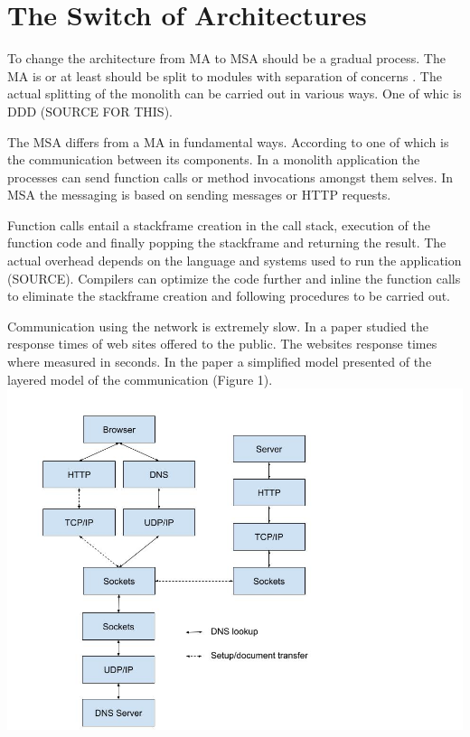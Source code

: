 \begin{sloppypar}


\section{The Switch of Architectures}
\begin{sloppypar}
    To change the architecture from MA to MSA should be a gradual process. The 
    MA is or at least should be  split to modules with separation of concerns 
    \citep{secchalmsa}. The actual splitting of the monolith can be carried out
     in various ways. One of whic is DDD (SOURCE FOR THIS).
\end{sloppypar}
\begin{sloppypar}
    The MSA differs from a MA in fundamental ways. According to \citet{fowlerlewisms} 
    one of which is the communication between its components. In a monolith 
    application the processes can send function calls or method invocations 
    amongst them selves. In MSA the messaging is based on sending messages or 
    HTTP requests.
\end{sloppypar}
\begin{sloppypar}
    Function calls entail a stackframe creation in the call stack, execution of 
    the function code and finally popping the stackframe and returning the result. 
    The actual overhead depends on the language and systems used to run the 
    application (SOURCE). Compilers can optimize the code further and inline 
    the function calls to eliminate the stackframe creation and following 
    procedures to be carried out.
\end{sloppypar}
\begin{sloppypar}
    Communication using the network is extremely slow. In a paper \citet{webdelays} 
    studied the response times of web sites offered to the public. The websites 
    response times where measured in seconds. In the paper a simplified model 
    presented of the layered model of the communication (Figure 1).
    \includegraphics[scale=0.5]{HTTPlayers}

\end{sloppypar}
\end{sloppypar}

